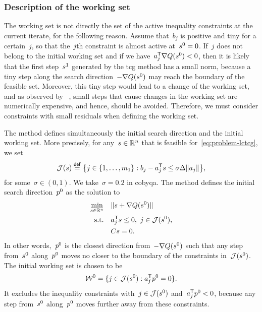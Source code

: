 \subsubsection{Description of the working set}

The working set is not directly the set of the active inequality constraints at the current iterate, for the following reason.
Assume that~$b_j$ is positive and tiny for a certain~$j$, so that the~$j$th constraint is almost active at~$\sstep[0] = 0$.
If~$j$ does not belong to the initial working set and if we have~$a_j^{\T} \nabla Q(\sstep[0]) < 0$, then it is likely that the first step~$\sstep[1]$ generated by the \gls{tcg} method has a small norm, because a tiny step along the search direction~$-\nabla Q(\sstep[0])$ may reach the boundary of the feasible set.
Moreover, this tiny step would lead to a change of the working set, and as observed by \citeauthor{Powell_2015}~\cite[\S~3]{Powell_2015}, small steps that cause changes in the working set are numerically
expensive, and hence, should be avoided.
Therefore, we must consider constraints with small residuals when defining the working set.

The method defines simultaneously the initial search direction and the initial working set.
More precisely, for any~$\sstep \in \R^n$ that is feasible for~\cref{eq:problem-lctcg}, we set
\begin{equation*}
    \mathcal{J}(\sstep) \eqdef \set[\big]{j \in \set{1, \dots, m_1} : b_j - a_j^{\T} \sstep \le \sigma \rad \norm{a_j}},
\end{equation*}
for some~$\sigma \in (0, 1)$.
We take~$\sigma = 0.2$ in \gls{cobyqa}.
The method defines the initial search direction~$\pstep[0]$ as the solution to
\begin{subequations}
    \label{eq:tcg-linear-working-set}
    \begin{align}
        \min_{\sstep \in \R^n}  & \quad \norm{\sstep + \nabla Q(\sstep[0])}\\
        \text{s.t.}             & \quad a_j^{\T} \sstep \le 0, ~ j \in \mathcal{J}(\sstep[0]),\\
                                & \quad C \sstep = 0.
    \end{align}
\end{subequations}
In other words,~$\pstep[0]$ is the closest direction from~$-\nabla Q(\sstep[0])$ such that any step from~$\sstep[0]$ along~$\pstep[0]$ moves no closer to the boundary of the constraints in~$\mathcal{J}(\sstep[0])$.
The initial working set is chosen to be
\begin{equation}
    \label{eq:tcg-linear-working-set-initial}
    \mathcal{W}^0 = \set{j \in \mathcal{J}(\sstep[0]) : a_j^{\T} \pstep[0] = 0}.
\end{equation}
It excludes the inequality constraints with~$j \in \mathcal{J}(\sstep[0])$ and~$a_j^{\T} \pstep[0] < 0$, because any step from~$\sstep[0]$ along~$\pstep[0]$ moves further away from these constraints.

